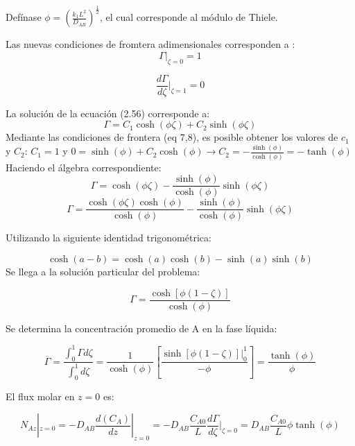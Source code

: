 Defínase $\phi=(\frac{k_1L^2}{D_{AB}})^\frac{1}{2}$, el cual corresponde al módulo de Thiele.

Las nuevas condiciones de fromtera adimensionales corresponden a :
\begin{equation}
 \Gamma|_{\zeta=0}=1   
\end{equation}

\begin{equation}
 \frac{d\Gamma}{d\zeta}|_{\zeta=1}=0   
\end{equation}

La solución de la ecuación (2.56) corresponde a:
\begin{equation}
    \Gamma=C_1\cosh({\phi\zeta})+C_2\sinh({\phi\zeta})
\end{equation}
 Mediante las condiciones de frontera (eq {7,8}), es posible obtener los valores de $c_1$ y $C_2$:
 $C_1=1$ y $0=\sinh({\phi})+C_2\cosh(\phi)\longrightarrow C_2=-\frac{\sinh(\phi)}{\cosh({\phi})}=-\tanh({\phi})$
Haciendo el álgebra correspondiente:
\begin{equation*}
 \Gamma=\cosh({\phi\zeta})-\frac{\sinh(\phi)}{\cosh({\phi})}\sinh({\phi\zeta})   
\end{equation*}
\begin{equation*}
 \Gamma=\frac{\cosh({\phi\zeta})\cosh(\phi)}{\cosh(\phi)}-\frac{\sinh({\phi})}{\cosh(\phi)}\sinh({\phi\zeta})   
\end{equation*}

 Utilizando la siguiente identidad trigonométrica: 

 \begin{equation*}
   \cosh({a-b})=\cosh({a})\cosh(b)-\sinh(a) \sinh(b) 
 \end{equation*}
Se llega a la solución particular del problema:


 \begin{equation}
  \Gamma=\frac{\cosh[{\phi(1-\zeta)}]}{\cosh({\phi})}   
 \end{equation}

 Se determina la concentración promedio de A en la fase líquida:

 \begin{equation}
     \overline{\Gamma}=\frac{\int_0^1\Gamma d\zeta}{\int_0^1d\zeta}=\frac{1}{\cosh(\phi)}[\frac{\sinh[\phi(1-\zeta)]|_{0}^1}{-\phi}]=\frac{\tanh(\phi)}{\phi}
 \end{equation}
 
El flux molar en $z=0$ es:

\begin{equation}
    N_{Az}|_{z=0}=-D_{AB}\frac{d(C_A)}{dz}|_{z=0}=-D_{AB}\frac{C_{A0}}{L}\frac{d\Gamma}{d\zeta}|_{\zeta=0}=D_{AB}\frac{C_{A0}}{L}\phi\tanh(\phi)
\end{equation}



